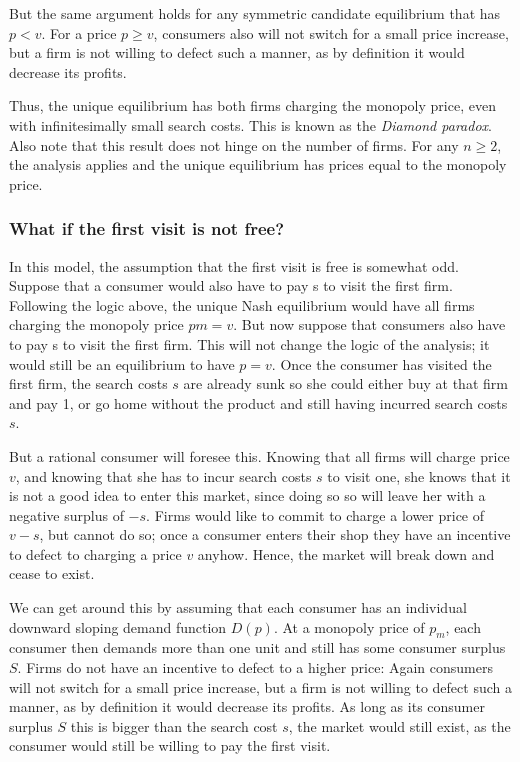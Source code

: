 But the same argument holds for any symmetric candidate equilibrium
that has $p<v$. For a price $p\geq v$, consumers also will not switch for
a small price increase, but a firm is not willing to defect such a
manner, as by definition it would decrease its profits.

Thus, the unique equilibrium has both firms charging the monopoly price,
even with infinitesimally small search costs. This is known as the
\textit{Diamond paradox}. Also note that this result does not hinge on
the number of firms. For any $n\geq2$, the analysis applies and the
unique equilibrium has prices equal to the monopoly price.
\subsubsection{What if the first visit is not free?}
In this model, the assumption that the first visit is free is somewhat odd. Suppose that
a consumer would also have to pay s to visit the first firm. Following the logic above,
the unique Nash equilibrium would have all firms charging the monopoly price $pm = v$.
But now suppose that consumers also have to pay s to visit the first firm. This will not
change the logic of the analysis; it would still be an equilibrium to have $p = v$. Once the
consumer has visited the first firm, the search costs $s$ are already sunk so she could either
buy at that firm and pay 1, or go home without the product and still having incurred
search costs $s$.

But a rational consumer will foresee this. Knowing that all firms will charge price $v$,
and knowing that she has to incur search costs $s$ to visit one, she knows that it is not a
good idea to enter this market, since doing so so will leave her with a negative surplus
of $-s$. Firms would like to commit to charge a lower price of $v-s$, but cannot do so;
once a consumer enters their shop they have an incentive to defect to charging a price $v$
anyhow. Hence, the market will break down and cease to exist.

We can get around this by assuming that each consumer has an individual downward
sloping demand function $D(p)$. At a monopoly price of $p_m$, each consumer then demands
more than one unit and still has some consumer surplus $S$. Firms do not have an incentive
to defect to a higher price: Again consumers will not switch for a small price increase,
but a firm is not willing to defect such a manner, as by definition it would decrease its
profits. As long as its consumer surplus $S$ this is bigger than the search cost $s$, the market
would still exist, as the consumer would still be willing to pay the first visit.
